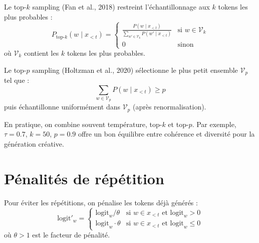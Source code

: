 \begin{definition}
Le top-$k$ sampling (Fan et al., 2018) restreint l'\'echantillonnage aux $k$
tokens les plus probables :
\[
P_{\text{top-}k}(w \mid x_{<t}) = \begin{cases}
\frac{P(w \mid x_{<t})}{\sum_{w' \in \mathcal{V}_k} P(w' \mid x_{<t})} & \text{si } w \in \mathcal{V}_k \\
0 & \text{sinon}
\end{cases}
\]
o\`u $\mathcal{V}_k$ contient les $k$ tokens les plus probables.
\end{definition}

\begin{definition}
Le top-$p$ sampling (Holtzman et al., 2020) s\'electionne le plus petit
ensemble $\mathcal{V}_p$ tel que :
\[
\sum_{w \in \mathcal{V}_p} P(w \mid x_{<t}) \geq p
\]
puis \'echantillonne uniform\'ement dans $\mathcal{V}_p$ (apr\`es
renormalisation).
\end{definition}

\begin{bonnepratique}[title=\textbf{Combinaison des strat\'egies}]
En pratique, on combine souvent temp\'erature, top-$k$ et top-$p$. Par exemple,
$\tau = 0.7$, $k = 50$, $p = 0.9$ offre un bon \'equilibre entre coh\'erence
et diversit\'e pour la g\'en\'eration cr\'eative.
\end{bonnepratique}

\section{P\'enalit\'es de r\'ep\'etition}
\label{sec:gen:repetition}

\begin{definition}
Pour \'eviter les r\'ep\'etitions, on p\'enalise les tokens d\'ej\`a g\'en\'er\'es :
\[
\text{logit}'_w = \begin{cases}
\text{logit}_w / \theta & \text{si } w \in x_{<t} \text{ et } \text{logit}_w > 0 \\
\text{logit}_w \cdot \theta & \text{si } w \in x_{<t} \text{ et } \text{logit}_w \leq 0
\end{cases}
\]
o\`u $\theta > 1$ est le facteur de p\'enalit\'e.
\end{definition}

